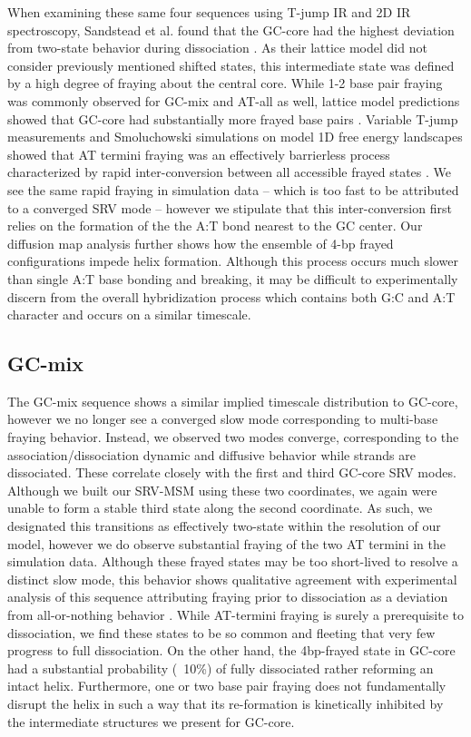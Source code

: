 \documentclass[journal=jpcbfk,manuscript=article]{achemso}
\begin{document}
When examining these same four sequences using T-jump IR and 2D IR spectroscopy, Sandstead et al. found that the GC-core had the highest deviation from two-state behavior during dissociation \citep{Sanstead2016}. As their lattice model did not consider previously mentioned shifted states, this intermediate state was defined by a high degree of fraying about the central core. While 1-2 base pair fraying was commonly observed for GC-mix and AT-all as well, lattice model predictions showed that GC-core had substantially more frayed base pairs \citep{Phys2019}. Variable T-jump measurements and Smoluchowski simulations on model 1D free energy landscapes showed that AT termini fraying was an effectively barrierless process characterized by rapid inter-conversion between all accessible frayed states \citep{Sanstead2018DirectDehybridization}. We see the same rapid fraying in simulation data -- which is too fast to be attributed to a converged SRV mode -- however we stipulate that this inter-conversion first relies on the formation of the the A:T bond nearest to the GC center. Our diffusion map analysis further shows how the ensemble of 4-bp frayed configurations impede helix formation. Although this process occurs much slower than single A:T base bonding and breaking, it may be difficult to experimentally discern from the overall hybridization process which contains both G:C and A:T character and occurs on a similar timescale.


\subsection{\label{sec:Results}GC-mix}

The GC-mix sequence shows a similar implied timescale distribution to GC-core, however we no longer see a converged slow mode corresponding to multi-base fraying behavior. Instead, we observed two modes converge, corresponding to the association/dissociation dynamic and diffusive behavior while strands are dissociated. These correlate closely with the first and third GC-core SRV modes. Although we built our SRV-MSM using these two coordinates, we again were unable to form a stable third state along the second coordinate. As such, we designated this transitions as effectively two-state within the resolution of our model, however we do observe substantial fraying of the two AT termini in the simulation data. Although these frayed states may be too short-lived to resolve a distinct slow mode, this behavior shows qualitative agreement with experimental analysis of this sequence attributing fraying prior to dissociation as a deviation from all-or-nothing behavior \citep{Sanstead2016}.  While AT-termini fraying is surely a prerequisite to dissociation, we find these states to be so common and fleeting that very few progress to full dissociation. On the other hand, the 4bp-frayed state in GC-core had a substantial probability (~10\%) of fully dissociated rather reforming an intact helix. Furthermore, one or two base pair fraying does not fundamentally disrupt the helix in such a way that its re-formation is kinetically inhibited by the intermediate structures we present for GC-core.  
\end{document}
